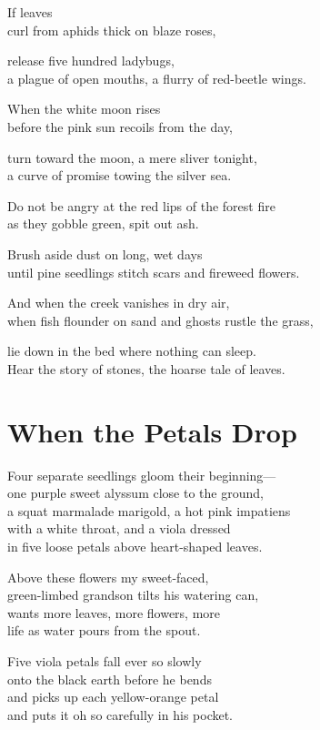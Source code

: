 \documentclass[twoside,10pt]{book}
\begin{document}
If leaves\\
curl from aphids thick on blaze roses,

release five hundred ladybugs,\\
a plague of open mouths, a flurry of red-beetle wings.

When the white moon rises\\
before the pink sun recoils from the day,

turn toward the moon, a mere sliver tonight,\\
a curve of promise towing the silver sea.

Do not be angry at the red lips of the forest fire\\
as they gobble green, spit out ash.

Brush aside dust on long, wet days\\
until pine seedlings stitch scars and fireweed flowers.

And when the creek vanishes in dry air,\\
when fish flounder on sand and ghosts rustle the grass,

lie down in the bed where nothing can sleep.\\
Hear the story of stones, the hoarse tale of leaves.


\clearpage
\section{When the Petals Drop}

Four separate seedlings gloom their beginning---\\
one purple sweet alyssum close to the ground,\\
a squat marmalade marigold, a hot pink impatiens\\
with a white throat, and a viola dressed\\
in five loose petals above heart-shaped leaves.

Above these flowers my sweet-faced,\\
green-limbed grandson tilts his watering can,\\
wants more leaves, more flowers, more\\
life as water pours from the spout.

Five viola petals fall ever so slowly\\
onto the black earth before he bends\\
and picks up each yellow-orange petal\\
and puts it oh so carefully in his pocket.
\end{document}
